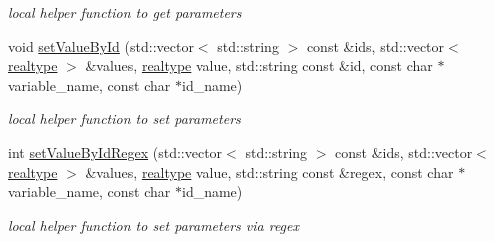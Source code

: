 \begin{DoxyCompactItemize}
\begin{DoxyCompactList}\small\item\em local helper function to get parameters \end{DoxyCompactList}\item 
void \mbox{\hyperlink{namespaceamici_a939bff838284994570395c19eb40923d}{set\+Value\+By\+Id}} (std\+::vector$<$ std\+::string $>$ const \&ids, std\+::vector$<$ \mbox{\hyperlink{namespaceamici_a1bdce28051d6a53868f7ccbf5f2c14a3}{realtype}} $>$ \&values, \mbox{\hyperlink{namespaceamici_a1bdce28051d6a53868f7ccbf5f2c14a3}{realtype}} value, std\+::string const \&id, const char $\ast$variable\+\_\+name, const char $\ast$id\+\_\+name)
\begin{DoxyCompactList}\small\item\em local helper function to set parameters \end{DoxyCompactList}\item 
int \mbox{\hyperlink{namespaceamici_a0094499812e5edffce2ae9f379b11abb}{set\+Value\+By\+Id\+Regex}} (std\+::vector$<$ std\+::string $>$ const \&ids, std\+::vector$<$ \mbox{\hyperlink{namespaceamici_a1bdce28051d6a53868f7ccbf5f2c14a3}{realtype}} $>$ \&values, \mbox{\hyperlink{namespaceamici_a1bdce28051d6a53868f7ccbf5f2c14a3}{realtype}} value, std\+::string const \&regex, const char $\ast$variable\+\_\+name, const char $\ast$id\+\_\+name)
\begin{DoxyCompactList}\small\item\em local helper function to set parameters via regex \end{DoxyCompactList}\end{DoxyCompactItemize}
